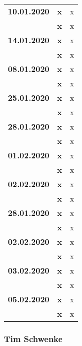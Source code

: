 {\begin{longtable}{|l|l|p{11cm}|}
		\\ \hline \textbf{10.01.2020}
			& \textbf{\hfill x} &x \\\cline{2-3}
			& \textbf{\hfill x} & x
		\\ \hline \textbf{14.01.2020}
			& \textbf{\hfill x} & x \\\cline{2-3}	
			& \textbf{\hfill x} & x
		\\ \hline \textbf{08.01.2020}
			& \textbf{\hfill x} & x \\\cline{2-3}
			& \textbf{\hfill x} & x
		\\ \hline \textbf{25.01.2020}
			& \textbf{\hfill x} & x \\\cline{2-3}
			& \textbf{\hfill x} & x
		\\ \hline \textbf{28.01.2020}
			& \textbf{\hfill x} & x \\\cline{2-3}
			& \textbf{\hfill x} & x
		\\ \hline \textbf{01.02.2020}
			& \textbf{\hfill x} & x \\\cline{2-3}
			& \textbf{\hfill x} & x
		\\ \hline \textbf{02.02.2020}
			& \textbf{\hfill x} & x \\\cline{2-3}
			& \textbf{\hfill x} & x
		\\ \hline \textbf{28.01.2020}
			& \textbf{\hfill x} & x \\\cline{2-3}
			& \textbf{\hfill x} & x
		\\ \hline \textbf{02.02.2020}
			& \textbf{\hfill x} & x \\\cline{2-3}
			& \textbf{\hfill x} & x
		\\ \hline \textbf{03.02.2020}
			& \textbf{\hfill x} & x \\\cline{2-3}
			& \textbf{\hfill x} & x
		\\ \hline \textbf{05.02.2020}
			& \textbf{\hfill x} & x \\\cline{2-3}
			& \textbf{\hfill x} & x \\
		\hline\hline
	\end{longtable}
}

\clearpage

\subsubsection{Tim Schwenke}

